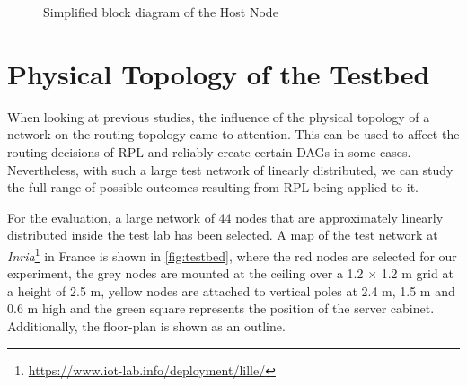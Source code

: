\begin{figure}
  \caption{Simplified block diagram of the Host Node}
  \label{fig:hnblock}
\end{figure}

\section{Physical Topology of the Testbed}
\label{sec:ptopo}

When looking at previous studies, the influence of the physical topology of a
network on the routing topology came to attention. This can be used to
affect the routing decisions of \ac{RPL} and reliably create certain \acp{DAG}
in some cases. Nevertheless, with such a large test network of linearly
distributed, we can study the full range of possible outcomes resulting from
\ac{RPL} being applied to it.

For the evaluation, a large network of 44 nodes that are approximately linearly
distributed inside the test lab has been selected. A map of the test network at
\emph{Inria}\footnote{\url{https://www.iot-lab.info/deployment/lille/}} in
France is shown in \autoref{fig:testbed}, where the red nodes are selected for
our experiment, the grey nodes are mounted at the ceiling over a 1.2 $\times$
1.2 m grid at a height of 2.5 m, yellow nodes are attached to vertical poles at
2.4 m, 1.5 m and 0.6 m high and the green square represents the position of the
server cabinet. Additionally, the floor-plan is shown as an outline.

